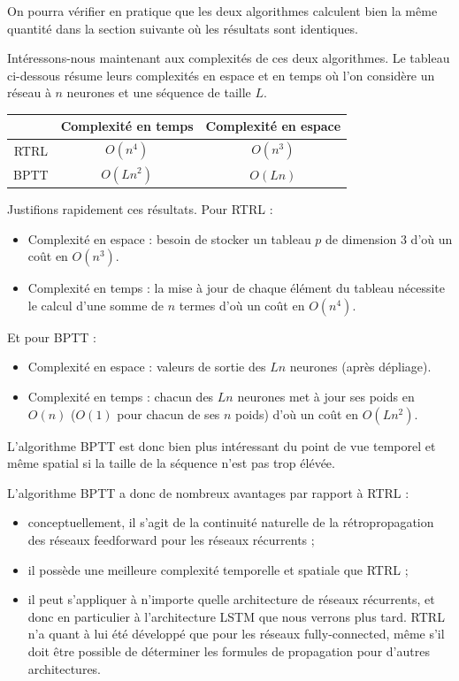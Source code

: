 On pourra vérifier en pratique que les deux algorithmes calculent bien la même quantité dans la section suivante où les résultats sont identiques.

Intéressons-nous maintenant aux complexités de ces deux algorithmes. Le tableau ci-dessous résume leurs complexités en espace et en temps où l'on considère un réseau à $n$ neurones et une séquence de taille $L$.

\begin{center}
\begin{tabular}{|c|c|c|}
\hline
& Complexité en temps & Complexité en espace \\
\hline 
RTRL & $O(n^4)$ & $O(n^{3})$ \\
\hline
BPTT & $O(Ln^2)$ & $O(Ln)$ \\
\hline
\end{tabular}
\end{center}

Justifions rapidement ces résultats. Pour RTRL :
\begin{itemize}
\item Complexité en espace : besoin de stocker un tableau $p$ de dimension $3$ d'où un coût en $O(n^3)$.
\item Complexité en temps : la mise à jour de chaque élément du tableau nécessite le calcul d'une somme de $n$ termes d'où un coût en $O(n^4)$.
\end{itemize}

Et pour BPTT :
\begin{itemize}
\item Complexité en espace : valeurs de sortie des $Ln$ neurones (après dépliage).
\item Complexité en temps : chacun des $Ln$ neurones met à jour ses poids en $O(n)$ ($O(1)$ pour chacun de ses $n$ poids) d'où un coût en $O(Ln^2)$.
\end{itemize}

L'algorithme BPTT est donc bien plus intéressant du point de vue temporel et même spatial si la taille de la séquence n'est pas trop élévée.

L'algorithme BPTT a donc de nombreux avantages par rapport à RTRL :
\begin{itemize}
\item conceptuellement, il s'agit de la continuité naturelle de la rétropropagation des réseaux feedforward pour les réseaux récurrents ;
\item il possède une meilleure complexité temporelle et spatiale que RTRL ;
\item il peut s'appliquer à n'importe quelle architecture de réseaux récurrents, et donc en particulier à l'architecture LSTM que nous verrons plus tard. RTRL n'a quant à lui été développé que pour les réseaux fully-connected, même s'il doit être possible de déterminer les formules de propagation pour d'autres architectures.
\end{itemize}

